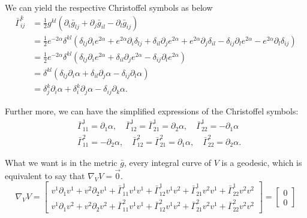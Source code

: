 \documentclass{article}
\theoremstyle{definition}
\theoremstyle{plain}
\begin{document}
We can yield the respective Christoffel symbols as below
\begin{align}
    \bar{\Gamma}^k_{ij} &= \frac12g^{kl}\left(\partial_i\bar{g}_{lj} + \partial_j\bar{g}_{il}  - \partial_l\bar{g}_{ij}\right) \\ \nonumber
	&=\frac12 e^{-2\alpha}\delta^{kl}\left(\delta_{lj}\partial_ie^{2\alpha}+e^{2\alpha}\partial_i\delta_{lj}+ \delta_{il}\partial_je^{2\alpha}+ e^{2\alpha}\partial_j \delta_{il}- \delta_{ij}\partial_le^{2\alpha}-e^{2\alpha}\partial_l\delta_{ij}\right)\\ \nonumber
	&=\frac12 e^{-2\alpha}\delta^{kl}\left(\delta_{lj}\partial_ie^{2\alpha} + \delta_{il}\partial_je^{2\alpha} - \delta_{ij}\partial_le^{2\alpha} \right)\\ \nonumber
	&=\delta^{kl}\left(\delta_{lj}\partial_i\alpha + \delta_{il}\partial_j\alpha - \delta_{ij}\partial_l\alpha\right)\\ \nonumber
	&=\delta^k_j\partial_i\alpha + \delta^k_i\partial_j\alpha - \delta_{ij}\partial_k\alpha.
\end{align}

Further more, we can have the simplified expressions of the Christoffel symbols:
\begin{align}
	&\bar{\Gamma}^1_{11} = \partial_1\alpha,\quad \bar{\Gamma}^1_{12} = \bar{\Gamma}^1_{21} = \partial_2\alpha,\quad 
	\bar{\Gamma}^1_{22} = -\partial_1\alpha \\ \nonumber
	&\bar{\Gamma}^2_{11} = -\partial_2\alpha,\quad \bar{\Gamma}^2_{12} = \bar{\Gamma}^2_{21} = \partial_1\alpha,\quad 
	\bar{\Gamma}^2_{22} = \partial_2\alpha.  
\end{align}

What we want is in the metric $\bar{g}$, every integral curve of $V$ is a geodesic, which is equivalent to say that $\nabla_VV=\vec{0}$.
\begin{equation}
    \nabla_V V=
    \left[\begin{array}{c}
    v^1\partial_1 v^1+v^2\partial_2 v^1+\bar{\Gamma}_{11}^1v^1v^1+\bar{\Gamma}_{12}^1v^1v^2+\bar{\Gamma}_{21}^1v^2v^1+\bar{\Gamma}_{22}^1v^2v^2 \\
    v^1\partial_1 v^2+v^2\partial_2 v^2+\bar{\Gamma}_{11}^2v^1v^1+\bar{\Gamma}_{12}^2v^1v^2+\bar{\Gamma}_{21}^2v^2v^1+\bar{\Gamma}_{22}^2v^2v^2
    \end{array}\right]
    =
    \left[\begin{array}{c}
    0 \\
    0
    \end{array}\right]
\end{equation}
\end{document}
